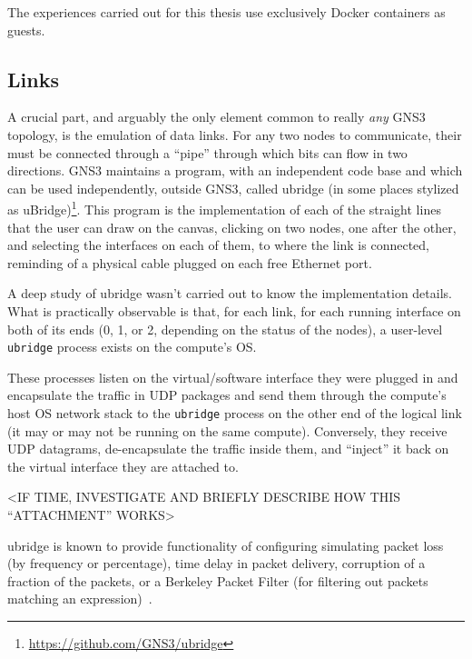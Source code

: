 The experiences carried out for this thesis use exclusively Docker containers as guests.

\subsection{Links}
\label{subsec:links}

A crucial part, and arguably the only element common to really \emph{any} GNS3 topology, is the emulation of data links.
For any two nodes to communicate, their  must be connected through a ``pipe'' through which bits can flow in two directions.
GNS3 maintains a program, with an independent code base and which can be used independently, outside GNS3, called ubridge (in some places stylized as uBridge)\footnote{\url{https://github.com/GNS3/ubridge}}.
This program is the implementation of each of the straight lines that the user can draw on the canvas, clicking on two nodes, one after the other, and selecting the interfaces on each of them, to where the link is connected, reminding of a physical cable plugged on each free Ethernet port.

A deep study of ubridge wasn't carried out to know the implementation details.
What is practically observable is that, for each link, for each running interface on both of its ends (0, 1, or 2, depending on the status of the nodes), a user-level \texttt{ubridge} process exists on the compute's OS.

These processes listen on the virtual/software interface they were plugged in and encapsulate the traffic in UDP packages and send them through the compute's host OS network stack to the \texttt{ubridge} process on the other end of the logical link (it may or may not be running on the same compute). %
Conversely, they receive UDP datagrams, de-encapsulate the traffic inside them, and ``inject'' it back on the virtual interface they are attached to.

<IF TIME, INVESTIGATE AND BRIEFLY DESCRIBE HOW THIS ``ATTACHMENT'' WORKS> %

ubridge is known to provide functionality of configuring simulating packet loss (by frequency or percentage), time delay in packet delivery, corruption of a fraction of the packets, or a Berkeley Packet Filter (for filtering out packets matching an expression)~\cite{ubridgereadme}.

